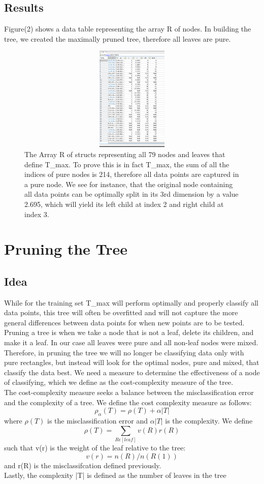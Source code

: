 \documentclass{article}
\begin{document}
\subsection*{Results}
Figure(2) shows a data table representing the array R of nodes.  In building the tree, we created the maximally pruned tree, therefore all leaves are pure.  
\begin{figure}[H]
    \centerline
    {\includegraphics[width=12cm, height=5cm]{GlassData_T_max.png}
    }
    \caption{\label{fig:my figure}The Array R of structs representing all 79 nodes and leaves that define T\_max.  To prove this is in fact T\_max, the sum of all the indices of pure nodes is 214, therefore all data points are captured in a pure node.  We see for instance, that the original node containing all data points can be optimally split in its 3rd dimension by a value 2.695, which will yield its left child at index 2 and right child at index 3. }
\end{figure}


\section*{Pruning the Tree}
\subsection*{Idea}
While for the training set T\_max will perform optimally and properly classify all data points, this tree will often be overfitted and will not capture the more general differences between data points for when new points are to be tested.  Pruning a tree is when we take a node that is not a leaf, delete its children, and make it a leaf.  In our case all leaves were pure and all non-leaf nodes were mixed.  Therefore, in pruning the tree we will no longer be classifying data only with pure rectangles, but instead will look for the optimal nodes, pure and mixed, that classify the data best.  We need a measure to determine the effectiveness of a node of classifying, which we define as the cost-complexity measure of the tree.  \\
The cost-complexity measure seeks a balance between the misclassification error and the complexity of a tree. We define the cost complexity measure as follows:
\[\rho_{\alpha}(T) = \rho(T) + \alpha|T| \]
where $\rho(T)$ is the misclassification error and $\alpha|T|$ is the complexity.  We define
\[ \rho(T) = \sum_{R\epsilon[leaf]} v(R)r(R) \]
such that v(r) is the weight of the leaf relative to the tree:
\[v(r)=n(R)/n(R(1)) \]
and r(R) is the misclassifcation defined previously.
\\Lastly, the complexity |T| is defined as the number of leaves in the tree
\end{document}
